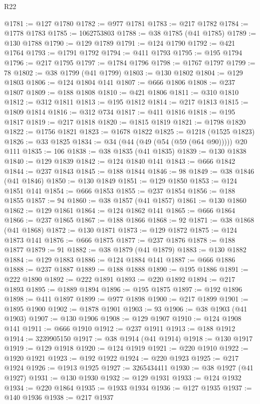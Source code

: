\begin{lexlean}{R22}
\begin{coremodule}
@1781 := @127 @1780
@1782 := @977 @1781
@1783 := @217 @1782
@1784 := @1778 @1783
@1785 := 1062753803
@1788 := @38 @1785 (@41 @1785)
@1789 := @130 @1788
@1790 := @129 @1789
@1791 := @124 @1790
@1792 := @421 @1764
@1793 := @1791 @1792
@1794 := @411 @1793
@1795 := @195 @1794
@1796 := @217 @1795
@1797 := @1784 @1796
@1798 := @1767 @1797
@1799 := 78
@1802 := @38 @1799 (@41 @1799)
@1803 := @130 @1802
@1804 := @129 @1803
@1806 := @124 @1804 @141
@1807 := @666 @1806
@1808 := @237 @1807
@1809 := @188 @1808
@1810 := @421 @1806
@1811 := @310 @1810
@1812 := @312 @1811
@1813 := @195 @1812
@1814 := @217 @1813
@1815 := @1809 @1814
@1816 := @312 @734
@1817 := @411 @1816
@1818 := @195 @1817
@1819 := @217 @1818
@1820 := @1815 @1819
@1821 := @1798 @1820
@1822 := @1756 @1821
@1823 := @1678 @1822
@1825 := @1218 (@1525 @1823)
@1826 := @33 @1825
@1834 := @34 (@44 (@49 (@54 (@59 (@64 @90))))) @20 @111
@1835 := 106
@1838 := @38 @1835 (@41 @1835)
@1839 := @130 @1838
@1840 := @129 @1839
@1842 := @124 @1840 @141
@1843 := @666 @1842
@1844 := @237 @1843
@1845 := @188 @1844
@1846 := 98
@1849 := @38 @1846 (@41 @1846)
@1850 := @130 @1849
@1851 := @129 @1850
@1853 := @124 @1851 @141
@1854 := @666 @1853
@1855 := @237 @1854
@1856 := @188 @1855
@1857 := 94
@1860 := @38 @1857 (@41 @1857)
@1861 := @130 @1860
@1862 := @129 @1861
@1864 := @124 @1862 @141
@1865 := @666 @1864
@1866 := @237 @1865
@1867 := @188 @1866
@1868 := 92
@1871 := @38 @1868 (@41 @1868)
@1872 := @130 @1871
@1873 := @129 @1872
@1875 := @124 @1873 @141
@1876 := @666 @1875
@1877 := @237 @1876
@1878 := @188 @1877
@1879 := 91
@1882 := @38 @1879 (@41 @1879)
@1883 := @130 @1882
@1884 := @129 @1883
@1886 := @124 @1884 @141
@1887 := @666 @1886
@1888 := @237 @1887
@1889 := @188 @1888
@1890 := @195 @1886
@1891 := @222 @1890
@1892 := @222 @1891
@1893 := @220 @1892
@1894 := @217 @1893
@1895 := @1889 @1894
@1896 := @195 @1875
@1897 := @192 @1896
@1898 := @411 @1897
@1899 := @977 @1898
@1900 := @217 @1899
@1901 := @1895 @1900
@1902 := @1878 @1901
@1903 := 93
@1906 := @38 @1903 (@41 @1903)
@1907 := @130 @1906
@1908 := @129 @1907
@1910 := @124 @1908 @141
@1911 := @666 @1910
@1912 := @237 @1911
@1913 := @188 @1912
@1914 := 3239905150
@1917 := @38 @1914 (@41 @1914)
@1918 := @130 @1917
@1919 := @129 @1918
@1920 := @124 @1919
@1921 := @220 @1910
@1922 := @1920 @1921
@1923 := @192 @1922
@1924 := @220 @1923
@1925 := @217 @1924
@1926 := @1913 @1925
@1927 := 3265434411
@1930 := @38 @1927 (@41 @1927)
@1931 := @130 @1930
@1932 := @129 @1931
@1933 := @124 @1932
@1934 := @220 @1864
@1935 := @1933 @1934
@1936 := @127 @1935
@1937 := @140 @1936
@1938 := @217 @1937

\end{coremodule}
\end{lexlean}
